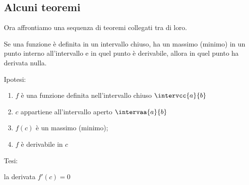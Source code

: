 \subsection{Alcuni teoremi}
\label{subsec:cont_teoremi}

Ora affrontiamo una sequenza di teoremi collegati tra di loro.
\begin{teorema}
Se una funzione è  
definita in un intervallo chiuso, 
ha un massimo (minimo) in un punto interno all'intervallo
e in quel punto è derivabile, 
allora in quel punto ha derivata nulla.
\end{teorema}

\vspace{-30mm}                           %
\begin{minipage}{.54\textwidth}
\noindent Ipotesi:
\begin{enumerate}[nosep]
 \item \(f\) è una funzione definita nell'intervallo chiuso 
\(\intervcc{a}{b}\)
 \item \(c\) appartiene all'intervallo aperto \(\intervaa{a}{b}\)
 \item \(f(c)\) è un massimo (minimo);
 \item \(f\) è derivabile in \(c\)
\end{enumerate}

\noindent Tesi: 

la derivata \(f'(c)=0\)
\end{minipage}
\hfill
\begin{minipage}{.42\textwidth}
\begin{center} \tfermat \end{center}
\end{minipage}


